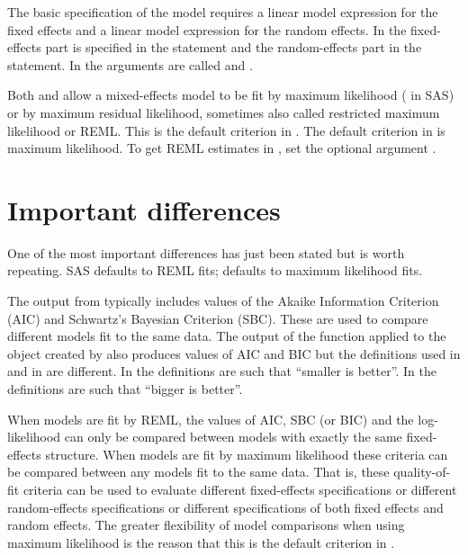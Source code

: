 \documentclass[12pt]{article}
\begin{document}
The basic specification of the model requires a linear model
expression for the fixed effects and a linear model expression for the 
random effects.  In  the fixed-effects part is
specified in the  statement and the random-effects
part in the  statement.  In  the
arguments are called  and .

Both  and  allow a mixed-effects model to
be fit by maximum likelihood ( in SAS) or by maximum
residual likelihood, sometimes also called restricted maximum
likelihood or \textsf{REML}.  This is the default criterion in .  The default criterion in  is maximum
likelihood.  To get \textsf{REML} estimates in , set the
optional argument .


\section{Important differences}
\label{sec:differences}

One of the most important differences has just been stated but is
worth repeating.  SAS defaults to \textsf{REML} fits; 
defaults to maximum likelihood fits.

The output from  typically includes values of the
Akaike Information Criterion (\textsf{AIC}) and Schwartz's Bayesian
Criterion (\textsf{SBC}).  These are used to compare different models
fit to the same data.  The output of the  function applied
to the object created by  also produces values of \textsf{AIC}
and \textsf{BIC} but the definitions used in  and in
 are different.  In  the definitions are such that
``smaller is better''.  In  the definitions are such
that ``bigger is better''.

When models are fit by \textsf{REML}, the values of \textsf{AIC},
\textsf{SBC} (or \textsf{BIC}) and the log-likelihood can only be
compared between models with exactly the same fixed-effects structure.
When models are fit by maximum likelihood these criteria can be
compared between any models fit to the same data.  That is, these
quality-of-fit criteria can be used to evaluate different
fixed-effects specifications or different random-effects
specifications or different specifications of both fixed effects and
random effects.  The greater flexibility of model comparisons when
using maximum likelihood is the reason that this is the default
criterion in .
\end{document}
